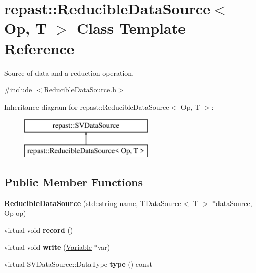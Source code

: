\hypertarget{classrepast_1_1_reducible_data_source}{\section{repast\-:\-:Reducible\-Data\-Source$<$ Op, T $>$ Class Template Reference}
\label{classrepast_1_1_reducible_data_source}
}


Source of data and a reduction operation.  




{\ttfamily \#include $<$Reducible\-Data\-Source.\-h$>$}

Inheritance diagram for repast\-:\-:Reducible\-Data\-Source$<$ Op, T $>$\-:\begin{figure}[H]
\begin{center}
\leavevmode
\includegraphics[height=2.000000cm]{classrepast_1_1_reducible_data_source}
\end{center}
\end{figure}
\subsection*{Public Member Functions}
\begin{DoxyCompactItemize}
\item 
\hypertarget{classrepast_1_1_reducible_data_source_a47e67b6bab27187c7a3ad62c7b97d7e5}{{\bfseries Reducible\-Data\-Source} (std\-::string name, \hyperlink{classrepast_1_1_t_data_source}{T\-Data\-Source}$<$ T $>$ $\ast$data\-Source, Op op)}\label{classrepast_1_1_reducible_data_source_a47e67b6bab27187c7a3ad62c7b97d7e5}

\item 
\hypertarget{classrepast_1_1_reducible_data_source_a349460403802a8c73d24ab03f2b3f87b}{virtual void {\bfseries record} ()}\label{classrepast_1_1_reducible_data_source_a349460403802a8c73d24ab03f2b3f87b}

\item 
\hypertarget{classrepast_1_1_reducible_data_source_a456dcb8f5ac22a6579ff31266dbb0846}{virtual void {\bfseries write} (\hyperlink{classrepast_1_1_variable}{Variable} $\ast$var)}\label{classrepast_1_1_reducible_data_source_a456dcb8f5ac22a6579ff31266dbb0846}

\item 
\hypertarget{classrepast_1_1_reducible_data_source_a5efa9f1e70161eaa6f5070551172d1ed}{virtual S\-V\-Data\-Source\-::\-Data\-Type {\bfseries type} () const }\label{classrepast_1_1_reducible_data_source_a5efa9f1e70161eaa6f5070551172d1ed}

\end{DoxyCompactItemize}
